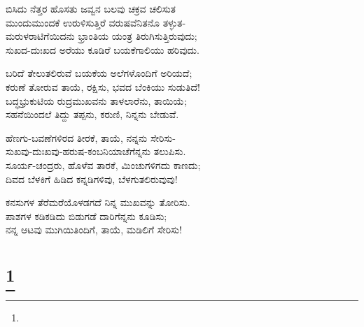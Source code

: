 \begin{myquote}
ಬಿಸಿದು ನೆತ್ತರ ಹೊಸತು ಜವ್ವನ ಬಲವು ಚಕ್ರವ ಚಲಿಸುತ\\ಮುಂದುಮುಂದಕೆ ಉರುಳಿಸುತ್ತಿರೆ ವರುಷವೆನಿತನೊ ತಳ್ಳುತ-\\ಮರುಳರಾಟಿಗೆಯಿದನು ಭ್ರಾಂತಿಯ ಯಂತ್ರ ತಿರುಗಿಸುತ್ತಿರುವುದು;\\ಸುಖದ-ದುಃಖದ ಅರೆಯು ಕೂಡಿರೆ ಬಯಕೆಗಾಲಿಯು ಹರಿವುದು.
\end{myquote}

\begin{myquote}
ಬರಿದೆ ತೇಲುತಲಿರುವೆ ಬಯಕೆಯ ಅಲೆಗಳೊಂದಿಗೆ ಅರಿಯದೆ;\\ಕರುಣೆ ತೋರುವ ತಾಯೆ, ರಕ್ಷಿಸು, ಭವದ ಬೆಂಕಿಯು ಸುಡುತಿದೆ!\\ಬದ್ಧಭ್ರುಕುಟಿಯ ರುದ್ರಮುಖವನು ತಾಳಲಾರೆನು, ತಾಯಿಯೆ;\\ಸಹನೆಯಿಂದಲೆ ತಿದ್ದು ತಪ್ಪನು, ಕರುಣಿ, ನಿನ್ನನು ಬೇಡುವೆ.
\end{myquote}

\begin{myquote}
ಹೆಣಗು-ಬವಣೆಗಳಿರದ ತೀರಕೆ, ತಾಯೆ, ನನ್ನನು ಸೇರಿಸು-\\ಸುಖವು-ದುಃಖವು-ಹರುಷ-ಕಂಬನಿಯಾಚೆಗೆನ್ನನು ತಲುಪಿಸು.\\ಸೂರ್ಯ-ಚಂದ್ರರು, ಹೊಳೆವ ತಾರಕೆ, ಮಿಂಚುಗಳಿಗದು ಕಾಣದು;\\ದಿವದ ಬೆಳಕಿಗೆ ಹಿಡಿದ ಕನ್ನಡಿಗಳಿವು, ಬೆಳಗುತಲಿರುವುವು!
\end{myquote}

\begin{myquote}
ಕನಸುಗಳ ತೆರೆಮರೆಯೊಳಡಗದೆ ನಿನ್ನ ಮುಖವನ್ನು ತೋರಿಸು.\\ಪಾಶಗಳ ಕಡಿಕಡಿದು ಬಿಡುಗಡೆ ದಾರಿಗೆನ್ನನು ಕೂಡಿಸು;\\ನನ್ನ ಆಟವು ಮುಗಿಯಿತಿಂದಿಗೆ, ತಾಯೆ, ಮಡಿಲಿಗೆ ಸೇರಿಸು!
\end{myquote}

\selecteng

\chapter[PEACE]{\protect\footnote{}}

\begin{myquote}
\end{myquote}

\begin{myquote}
\end{myquote}

